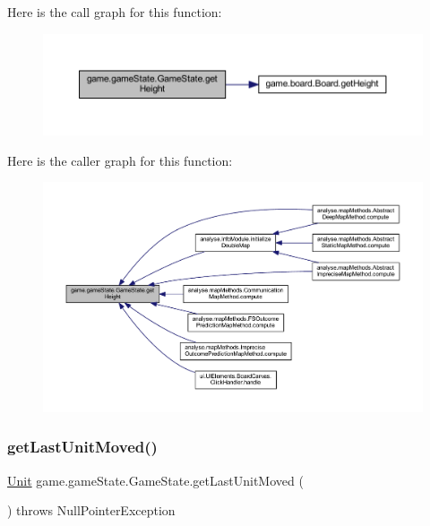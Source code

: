 Here is the call graph for this function\+:
\nopagebreak
\begin{figure}[H]
\begin{center}
\leavevmode
\includegraphics[width=350pt]{classgame_1_1game_state_1_1_game_state_a47a2783808cfff8d970c253a1f8a4a94_cgraph}
\end{center}
\end{figure}
Here is the caller graph for this function\+:
\nopagebreak
\begin{figure}[H]
\begin{center}
\leavevmode
\includegraphics[width=350pt]{classgame_1_1game_state_1_1_game_state_a47a2783808cfff8d970c253a1f8a4a94_icgraph}
\end{center}
\end{figure}
\mbox{\label{classgame_1_1game_state_1_1_game_state_ac74c805b98b13a313b0a337e5fbd41d2}} 
\subsubsection{\texorpdfstring{get\+Last\+Unit\+Moved()}{getLastUnitMoved()}}
{\footnotesize\ttfamily \mbox{\hyperlink{classgame_1_1board_1_1_unit}{Unit}} game.\+game\+State.\+Game\+State.\+get\+Last\+Unit\+Moved (\begin{DoxyParamCaption}{ }\end{DoxyParamCaption}) throws Null\+Pointer\+Exception\hspace{0.3cm}{\ttfamily [inline]}}

